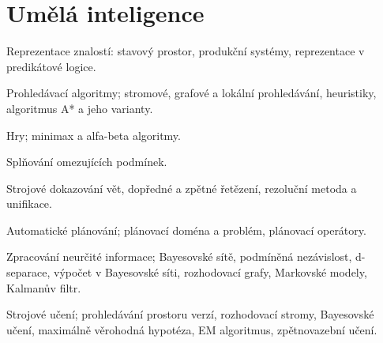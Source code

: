 \newpage
\section{Umělá inteligence}
\begin{pozadavky}
\begin{pitemize}
\item Reprezentace znalostí: stavový prostor, produkční systémy, reprezentace v predikátové logice.
\item Prohledávací algoritmy; stromové, grafové a lokální prohledávání, heuristiky, algoritmus A* a jeho varianty.
\item Hry; minimax a alfa-beta algoritmy.
\item Splňování omezujících podmínek.
\item Strojové dokazování vět, dopředné a zpětné řetězení, rezoluční metoda a unifikace.
\item Automatické plánování; plánovací doména a problém, plánovací operátory.
\item Zpracování neurčité informace; Bayesovské sítě, podmíněná nezávislost, d-separace, výpočet v Bayesovské síti, rozhodovací grafy, Markovské modely, Kalmanův filtr.
\item Strojové učení; prohledávání prostoru verzí, rozhodovací stromy, Bayesovské učení, maximálně věrohodná hypotéza, EM algoritmus, zpětnovazební učení.
\end{pitemize}
\end{pozadavky}







